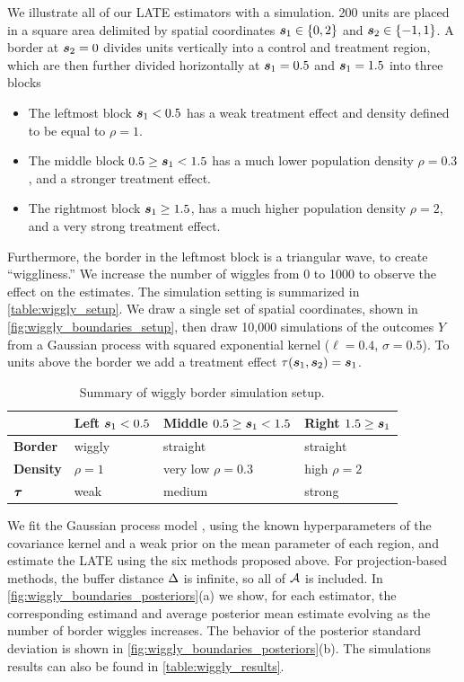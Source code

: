 	We illustrate all of our LATE estimators with a simulation.
200 units are placed in a square area delimited by spatial coordinates \(\bm{s}_1 \in \left\lbrace0,2\right\rbrace\) and \(\bm{s}_2 \in \left\lbrace-1, 1\right\rbrace\).
A border at \(\bm{s}_2=0\) divides units vertically into a control and treatment region,
which are then further divided horizontally at \(\bm{s}_1=0.5\) and \(\bm{s}_1=1.5\) into three blocks
\begin{itemize}
\item
  The leftmost block \(\bm{s}_1 < 0.5\) has a weak treatment effect and density defined to be equal to \(\rho=1\).
\item
  The middle block \(0.5 \ge \bm{s}_1 < 1.5\) has a much lower population density \(\rho=0.3\), and a stronger treatment effect.
\item
  The rightmost block \(\bm{s}_1 \ge 1.5\), has a much higher population density \(\rho=2\), and a very strong treatment effect.
\end{itemize}
Furthermore, the border in the leftmost block is a triangular wave, to create ``wiggliness.''
We increase the number of wiggles from 0 to 1000 to observe the effect on the estimates.
The simulation setting is summarized in \autoref{table:wiggly_setup}.
We draw a single set of spatial coordinates, shown in \autoref{fig:wiggly_boundaries_setup}, then draw 10,000 simulations of the outcomes \(Y\) from a Gaussian process with squared exponential kernel (\(\ell=0.4\), \(\sigma=0.5\)).
To units above the border we add a treatment effect \(\tau(\bm{s}_1, \bm{s}_2) = \bm{s}_1\).



\begin{table}[tbp]
\centering
\bgroup
\def\arraystretch{1.1}%
\begin{tabular}{llll}
\hline
& Left \(\bm{s}_1< 0.5\) & Middle \(0.5 \ge \bm{s}_1 < 1.5\) & Right \(1.5 \ge \bm{s}_1\)\tabularnewline
\hline
\textbf{Border} & wiggly & straight & straight\tabularnewline
\textbf{Density} & \(\rho=1\) & very low \(\rho=0.3\) & high \(\rho=2\)\tabularnewline
\(\bm{\tau}\) & weak & medium & strong\tabularnewline
\hline
\end{tabular}
\egroup
\caption{
	Summary of wiggly border simulation setup. 
	\label{table:wiggly_setup}}
\end{table}

	We fit the Gaussian process model ,
using the known hyperparameters of the covariance kernel and a weak prior on the mean parameter of each region,
and estimate the LATE using the six methods proposed above.
For projection-based methods, the buffer distance \(\Delta\) is infinite, so all of \(\mathcal{A}\) is included.
In \autoref{fig:wiggly_boundaries_posteriors}(a) we show, for each estimator, the corresponding estimand and average posterior mean estimate evolving as the number of border wiggles increases.
The behavior of the posterior standard deviation is shown in \autoref{fig:wiggly_boundaries_posteriors}(b).
The simulations results can also be found in \autoref{table:wiggly_results}.



